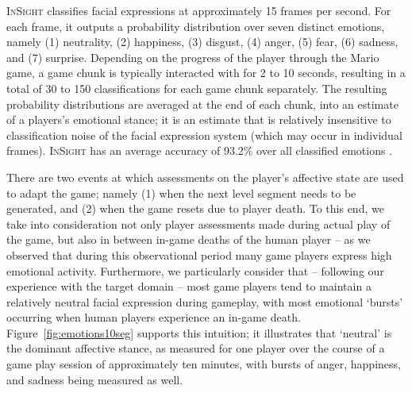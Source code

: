 \documentclass[letterpaper]{article}
\begin{document}
\textsc{InSight} classifies facial expressions at approximately 15 frames per second. For each frame, it outputs a probability distribution over seven distinct emotions, namely (1) neutrality, (2) happiness, (3) disgust, (4) anger, (5) fear, (6) sadness, and (7) surprise. Depending on the progress of the player through the Mario game, a game chunk is typically interacted with for 2 to 10 seconds, resulting in a total of 30 to 150 classifications for each game chunk separately. The resulting probability distributions are averaged at the end of each chunk, into an estimate of a players's emotional stance; it is an estimate that is relatively insensitive to classification noise of the facial expression system (which may occur in individual frames). \textsc{InSight} has an average accuracy of 93.2\% over all classified emotions \cite{InSight}.

There are two events at which assessments on the player's affective state are used to adapt the game; namely (1) when the next level segment needs to be generated, and (2) when the game resets due to player death. To this end, we take into consideration not only player assessments made during actual play of the game, but also in between in-game deaths of the human player -- as we observed that during this observational period many game players express high emotional activity. Furthermore, we particularly consider that -- following our experience with the target domain -- most game players tend to maintain a relatively neutral facial expression during gameplay, with most emotional `bursts' occurring when human players experience an in-game death. Figure~\ref{fig:emotions10seg} supports this intuition; it illustrates that `neutral' is the dominant affective stance, as measured for one player over the course of a game play session of approximately ten minutes, with bursts of anger, happiness, and sadness being measured as well.
\end{document}
